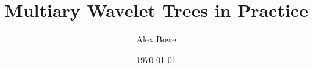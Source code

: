 \documentclass[a4paper]{report}
\begin{document}
\title{Multiary Wavelet Trees in Practice}
\author{Alex Bowe}
\date{\today}


\maketitle



\begin{abstract}

\end{abstract}




\end{document}
